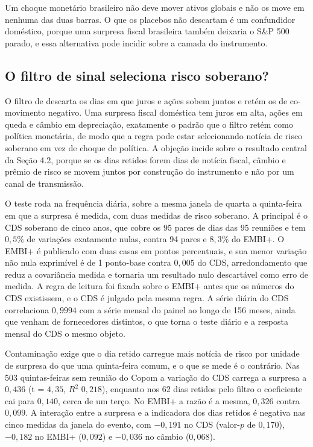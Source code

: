 \documentclass[preprint,authoryear,review,12pt]{elsarticle}
\begin{document}
Um choque monetário brasileiro não deve mover ativos globais e não os move em nenhuma das duas barras. O que os placebos não descartam é um confundidor doméstico, porque uma surpresa fiscal brasileira também deixaria o S\&P 500 parado, e essa alternativa pode incidir sobre a camada do instrumento.

\subsection{O filtro de sinal seleciona risco soberano?}
\label{sec:confound}

O filtro de \cite{jarocinski2020} descarta os dias em que juros e ações sobem juntos e retém os de co-movimento negativo. Uma surpresa fiscal doméstica tem juros em alta, ações em queda e câmbio em depreciação, exatamente o padrão que o filtro retém como política monetária, de modo que a regra pode estar selecionando notícia de risco soberano em vez de choque de política. A objeção incide sobre o resultado central da Seção 4.2, porque se os dias retidos forem dias de notícia fiscal, câmbio e prêmio de risco se movem juntos por construção do instrumento e não por um canal de transmissão.

O teste roda na frequência diária, sobre a mesma janela de quarta a quinta-feira em que a surpresa é medida, com duas medidas de risco soberano. A principal é o CDS soberano de cinco anos, que cobre os 95 pares de dias das 95 reuniões e tem $0{,}5\%$ de variações exatamente nulas, contra 94 pares e $8{,}3\%$ do EMBI+. O EMBI+ é publicado com duas casas em pontos percentuais, e sua menor variação não nula exprimível é de 1 ponto-base contra $0{,}005$ do CDS, arredondamento que reduz a covariância medida e tornaria um resultado nulo descartável como erro de medida. A regra de leitura foi fixada sobre o EMBI+ antes que os números do CDS existissem, e o CDS é julgado pela mesma regra. A série diária do CDS correlaciona $0{,}9994$ com a série mensal do painel ao longo de 156 meses, ainda que venham de fornecedores distintos, o que torna o teste diário e a resposta mensal do CDS o mesmo objeto.

Contaminação exige que o dia retido carregue mais notícia de risco por unidade de surpresa do que uma quinta-feira comum, e o que se mede é o contrário. Nas 503 quintas-feiras sem reunião do Copom a variação do CDS carrega a surpresa a $0{,}436$ (t = $4{,}35$, $R^2$ $0{,}218$), enquanto nos 62 dias retidos pelo filtro o coeficiente cai para $0{,}140$, cerca de um terço. No EMBI+ a razão é a mesma, $0{,}326$ contra $0{,}099$. A interação entre a surpresa e a indicadora dos dias retidos é negativa nas cinco medidas da janela do evento, com $-0{,}191$ no CDS (valor-$p$ de $0{,}170$), $-0{,}182$ no EMBI+ ($0{,}092$) e $-0{,}036$ no câmbio ($0{,}068$).
\end{document}
